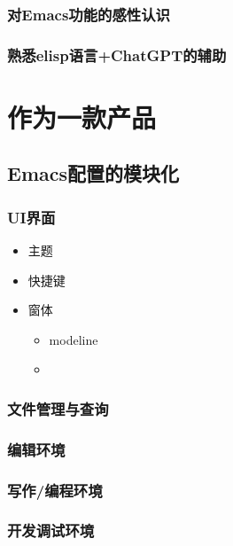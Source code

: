 \documentclass[11pt]{article}
\begin{document}
\subsubsection{对Emacs功能的感性认识}
\label{sec:org87f6e9e}

\subsubsection{熟悉elisp语言+ChatGPT的辅助}
\label{sec:orgcdc2145}


\section{作为一款产品}
\label{sec:org687bf64}

\subsection{Emacs配置的模块化}
\label{sec:orgc6411ef}
\subsubsection{UI界面}
\label{sec:orgd82f36e}

\begin{itemize}
\item 主题
\item 快捷键
\item 窗体
\begin{itemize}
\item modeline
\item 
\end{itemize}
\end{itemize}

\subsubsection{文件管理与查询}
\label{sec:org35f156b}

\subsubsection{编辑环境}
\label{sec:orgf9412f7}

\subsubsection{写作/编程环境}
\label{sec:orgf75ef01}


\subsubsection{开发调试环境}
\label{sec:orgf2779d4}
\end{document}
